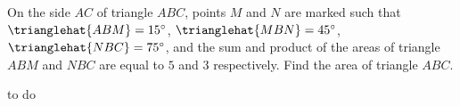 On the side ${AC}$ of triangle ${ABC}$, points $M$ and $N$ are marked such that $\trianglehat{ABM}=15\degree$, $\trianglehat{MBN}=45\degree$, $\trianglehat{NBC}=75\degree$, and the sum and product of the areas of triangle ${ABM}$ and ${NBC}$ are equal to $5$ and $3$ respectively. Find the area of triangle ${ABC}$.
\begin{answer}
to do
\end{answer}
